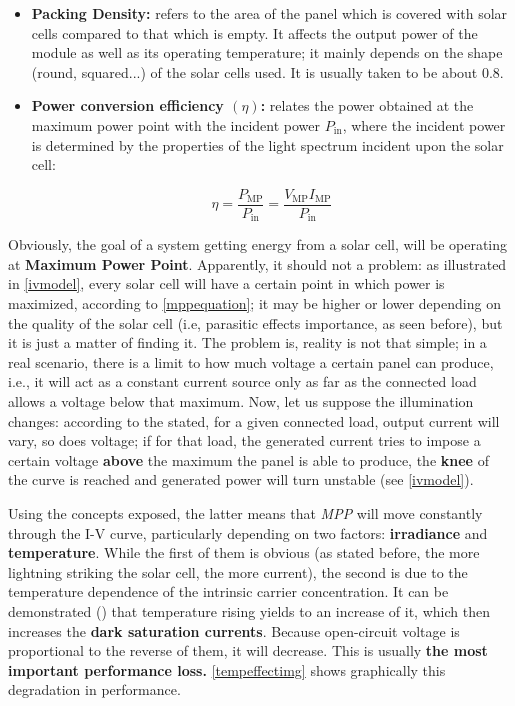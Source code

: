 \begin{itemize}
	\item{\textbf{Packing Density:}  refers to the area of the panel which is covered with solar cells compared to that which is empty. It affects the output power of the module as well as its operating temperature; it mainly depends on the shape (round, squared...) of the solar cells used. It is usually taken to be about 0.8.	}
	
	\item{\textbf{Power conversion efficiency $(\eta)$:} relates the power obtained at the maximum power point with the incident power $P_{\text{in}}$, where the incident power is determined by the properties of the light spectrum incident upon the solar cell}:
	
	\begin{equation} 
		\eta=\frac{P_{\text{MP}}}{P_{\text{in}}}=\frac{V_{\text{MP}}I_{\text{MP}}}{P_{\text{in}}} \label{efficencysolarcell}
	\end{equation}

\end{itemize}

Obviously, the goal of a system getting energy from a solar cell, will be operating at \textbf{Maximum Power Point}. Apparently, it should not a problem: as illustrated in \autoref{ivmodel}, every solar cell will have a certain point in which power is maximized, according to \autoref{mppequation}; it may be higher or lower depending on the quality of the solar cell (i.e, parasitic effects importance, as seen before), but it is just a matter of finding it. The problem is, reality is not that simple; in a real scenario, there is a limit to how much voltage a certain panel can produce, i.e., it will act as a constant current source only as far as the connected load allows a voltage below that maximum. Now, let us suppose the illumination changes: according to the stated, for a given connected load, output current will vary, so does voltage; if for that load, the generated current tries to impose a certain voltage \textbf{above} the maximum the panel is able to produce, the \textbf{knee} of the curve is reached and generated power will turn unstable (see \autoref{ivmodel}).

 Using the concepts exposed, the latter means that \textit{MPP} will move constantly through the I-V curve, particularly depending on two factors: \textbf{irradiance} and \textbf{temperature}. While the first of them is obvious (as stated before, the more lightning striking the solar cell, the more current), the second is due to the temperature dependence of the intrinsic carrier concentration. It can be demonstrated (\cite{photovoltaichandbook}) that temperature rising yields to an increase of it, which then increases the \textbf{dark saturation currents}. Because open-circuit voltage is proportional to the reverse of them, it will decrease. This is usually \textbf{the most important performance loss.} \autoref{tempeffectimg} shows graphically this degradation in performance.

